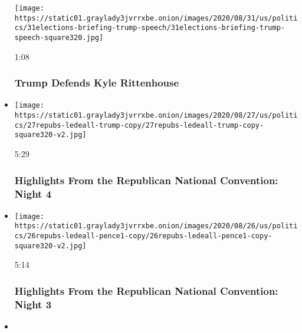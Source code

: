 \begin{itemize}
  \texttt{[image: https://static01.graylady3jvrrxbe.onion/images/2020/08/31/us/politics/31elections-briefing-trump-speech/31elections-briefing-trump-speech-square320.jpg]}

  1:08

  \hypertarget{trump-defends-kyle-rittenhouse}{%
  \subsubsection{Trump Defends Kyle
  Rittenhouse}\label{trump-defends-kyle-rittenhouse}}
\item
  \href{https://www.nytimes3xbfgragh.onion/video/us/politics/100000007312239/republican-national-convention-highlights.html?action=click\&module=video-series-bar\&region=header\&pgtype=Article\&playlistId=video/us-politics}{}

  \texttt{[image: https://static01.graylady3jvrrxbe.onion/images/2020/08/27/us/politics/27repubs-ledeall-trump-copy/27repubs-ledeall-trump-copy-square320-v2.jpg]}

  5:29

  \hypertarget{highlights-from-the-republican-national-convention-night-4}{%
  \subsubsection{Highlights From the Republican National Convention:
  Night
  4}\label{highlights-from-the-republican-national-convention-night-4}}
\item
  \href{https://www.nytimes3xbfgragh.onion/video/us/politics/100000007309878/republican-national-convention-highlights.html?action=click\&module=video-series-bar\&region=header\&pgtype=Article\&playlistId=video/us-politics}{}

  \texttt{[image: https://static01.graylady3jvrrxbe.onion/images/2020/08/26/us/politics/26repubs-ledeall-pence1-copy/26repubs-ledeall-pence1-copy-square320-v2.jpg]}

  5:14

  \hypertarget{highlights-from-the-republican-national-convention-night-3}{%
  \subsubsection{Highlights From the Republican National Convention:
  Night
  3}\label{highlights-from-the-republican-national-convention-night-3}}
\item
  \href{https://www.nytimes3xbfgragh.onion/video/us/politics/100000007307788/republican-national-convention-highlights.html?action=click\&module=video-series-bar\&region=header\&pgtype=Article\&playlistId=video/us-politics}{}


\end{itemize}
